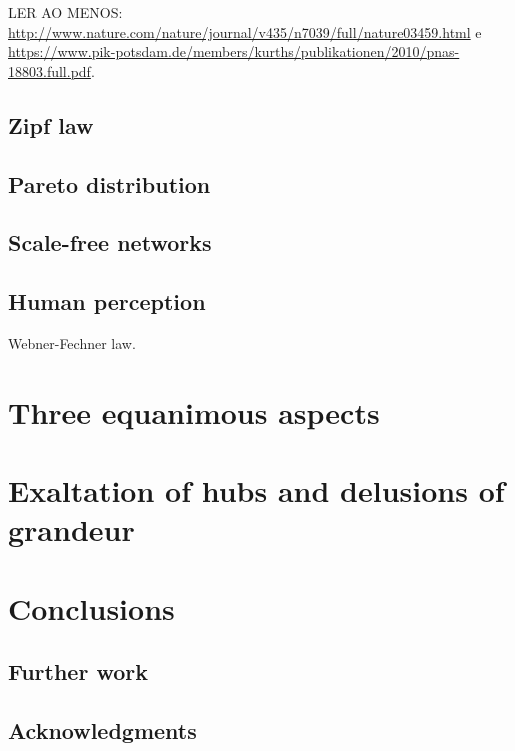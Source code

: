 \documentclass[a4paper, 11pt]{article} %
\begin{document}
LER AO MENOS: \url{http://www.nature.com/nature/journal/v435/n7039/full/nature03459.html} e \url{https://www.pik-potsdam.de/members/kurths/publikationen/2010/pnas-18803.full.pdf}.


\subsection{Zipf law}
\subsection{Pareto distribution}
\subsection{Scale-free networks}
\subsection{Human perception}
Webner-Fechner law.


\section{Three equanimous aspects}\label{sec:three}

\section{Exaltation of hubs and delusions of grandeur}\label{sec:delusion}

\section{Conclusions}\label{sec:con}
\subsection{Further work}
\subsection{Acknowledgments}

%
%



\end{document}
